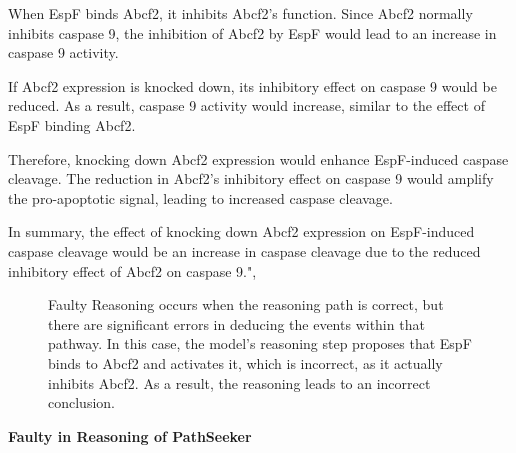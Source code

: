 \begin{tcolorbox}[breakable]
When EspF binds Abcf2, it inhibits Abcf2's function. Since Abcf2 normally inhibits caspase 9, the inhibition of Abcf2 by EspF would lead to an increase in caspase 9 activity.

If Abcf2 expression is knocked down, its inhibitory effect on caspase 9 would be reduced. As a result, caspase 9 activity would increase, similar to the effect of EspF binding Abcf2.

Therefore, knocking down Abcf2 expression would enhance EspF-induced caspase cleavage. The reduction in Abcf2's inhibitory effect on caspase 9 would amplify the pro-apoptotic signal, leading to increased caspase cleavage.

In summary, the effect of knocking down Abcf2 expression on EspF-induced caspase cleavage would be an increase in caspase cleavage due to the reduced inhibitory effect of Abcf2 on caspase 9.",
\end{tcolorbox}
\begin{figure}[!h]
    \vspace{0.01cm}
    \caption{Faulty Reasoning occurs when the reasoning path is correct, but there are significant errors in deducing the events within that pathway. In this case, the model's reasoning step proposes that EspF binds to Abcf2 and activates it, which is incorrect, as it actually inhibits Abcf2. As a result, the reasoning leads to an incorrect conclusion.}
\end{figure}

\textbf{Faulty in Reasoning of PathSeeker}

